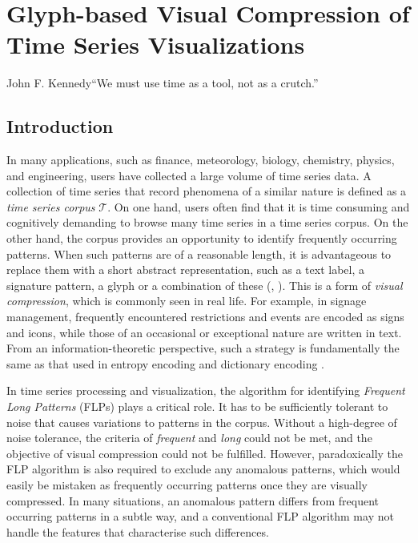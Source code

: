 
\chapter{Glyph-based Visual Compression of Time Series Visualizations}
\label{chap:timeseries}

\begin{chapquote}{John F. Kennedy}{``We must use time as a tool, not as a crutch.''}
\end{chapquote}

\section{Introduction}
In many applications, such as finance, meteorology, biology, chemistry, physics, and engineering, users have collected a large volume of time series data.
A collection of time series that record phenomena of a similar nature is defined as a \emph{time series corpus} $\mathcal{T}$.
On one hand, users often find that it is time consuming and cognitively demanding to browse many time series in a time series corpus.
On the other hand, the corpus provides an opportunity to identify frequently occurring patterns.
When such patterns are of a reasonable length, it is advantageous to replace them with a short abstract representation, such as a text label, a signature pattern, a glyph or a combination of these (\eg, \cite{haovisual2012}).
This is a form of \emph{visual compression}, which is commonly seen in real life.
For example, in signage management, frequently encountered restrictions and events are encoded as signs and icons, while those of an occasional or exceptional nature are written in text. From an information-theoretic perspective, such a strategy is fundamentally the same as that used in entropy encoding and dictionary encoding \cite{Chen10,lang2010}.

In time series processing and visualization, the algorithm for identifying \emph{Frequent Long Patterns} (FLPs) plays a critical role.
It has to be sufficiently tolerant to noise that causes variations to patterns in the corpus.
Without a high-degree of noise tolerance, the criteria of \emph{frequent} and \emph{long} could not be met, and the objective of visual compression could not be fulfilled.
However, paradoxically the FLP algorithm is also required to exclude any anomalous patterns, which would easily be mistaken as frequently occurring patterns once they are visually compressed.
In many situations, an anomalous pattern differs from frequent occurring patterns in a subtle way, and a conventional FLP algorithm may not handle the features that characterise such differences.


